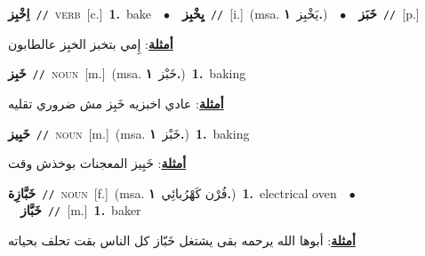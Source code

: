 \documentclass[10pt,a4paper,twoside]{article} %
\begin{document}
\begin{multicols}{2}
{{\setlength\topsep{0pt}\textbf{\foreignlanguage{arabic}{اِخْبِز}}\ {\color{gray}\texttt{//}\color{black}}\ \textsc{verb}\ [c.]\ \textbf{1.}~bake\ \ $\bullet$\ \ \setlength\topsep{0pt}\textbf{\foreignlanguage{arabic}{يِخْبِز}}\ {\color{gray}\texttt{//}\color{black}}\ [i.]\ \color{gray}(msa. \foreignlanguage{arabic}{يَخْبِز}~\foreignlanguage{arabic}{\textbf{١.}})\color{black}\ \ $\bullet$\ \ \setlength\topsep{0pt}\textbf{\foreignlanguage{arabic}{خَبَز}}\ {\color{gray}\texttt{//}\color{black}}\ [p.]\  \begin{flushright}\color{gray}\foreignlanguage{arabic}{\textbf{\underline{\foreignlanguage{arabic}{أمثلة}}}: إِمي بتخبز الخبِز عالطابون}\end{flushright}\color{black}} \vspace{2mm}

{\setlength\topsep{0pt}\textbf{\foreignlanguage{arabic}{خَبِز}}\ {\color{gray}\texttt{//}\color{black}}\ \textsc{noun}\ [m.]\ \color{gray}(msa. \foreignlanguage{arabic}{خَبْز}~\foreignlanguage{arabic}{\textbf{١.}})\color{black}\ \textbf{1.}~baking\  \begin{flushright}\color{gray}\foreignlanguage{arabic}{\textbf{\underline{\foreignlanguage{arabic}{أمثلة}}}: عادي اخبزيه خَبِز مش ضروري تقليه}\end{flushright}\color{black}} \vspace{2mm}

{\setlength\topsep{0pt}\textbf{\foreignlanguage{arabic}{خَبِيز}}\ {\color{gray}\texttt{//}\color{black}}\ \textsc{noun}\ [m.]\ \color{gray}(msa. \foreignlanguage{arabic}{خَبْز}~\foreignlanguage{arabic}{\textbf{١.}})\color{black}\ \textbf{1.}~baking\  \begin{flushright}\color{gray}\foreignlanguage{arabic}{\textbf{\underline{\foreignlanguage{arabic}{أمثلة}}}: خَبِيز المعجنات بوخذش وقت}\end{flushright}\color{black}} \vspace{2mm}

{\setlength\topsep{0pt}\textbf{\foreignlanguage{arabic}{خَبَّازِة}}\ {\color{gray}\texttt{//}\color{black}}\ \textsc{noun}\ [f.]\ \color{gray}(msa. \foreignlanguage{arabic}{فُرْن كَهْرُبائِي}~\foreignlanguage{arabic}{\textbf{١.}})\color{black}\ \textbf{1.}~electrical oven\ \ $\bullet$\ \ \setlength\topsep{0pt}\textbf{\foreignlanguage{arabic}{خَبَّاز}}\ {\color{gray}\texttt{//}\color{black}}\ [m.]\ \textbf{1.}~baker\  \begin{flushright}\color{gray}\foreignlanguage{arabic}{\textbf{\underline{\foreignlanguage{arabic}{أمثلة}}}: أبوها الله يرحمه بقى يشتغل خَبّاز كل الناس بقت تحلف بحياته}\end{flushright}\color{black}} \vspace{2mm}

}
\end{multicols}
\end{document}
